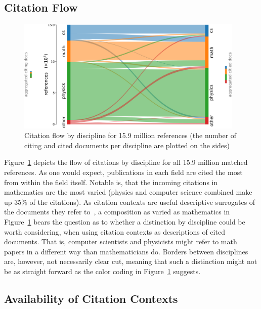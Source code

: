 \subsection{Citation Flow}

\begin{figure}
  \centering
    \includegraphics[width=0.97\textwidth]{figures/corpus/Fig7.pdf}
  \caption[Citation flow by discipline for 15.9 million references]{Citation flow by discipline for 15.9 million references (the number of citing and cited documents per discipline are plotted on the sides)}
  \label{fig:sankey}
\end{figure}

Figure~\ref{fig:sankey} depicts the flow of citations by discipline for all 15.9 million matched references. As one would expect, publications in each field are cited the most from within the field itself. Notable is, that the incoming citations in mathematics are the most varied (physics and computer science combined make up 35\% of the citations). As citation contexts are useful descriptive surrogates of the documents they refer to~\cite{Elkiss2008}, a composition as varied as mathematics in Figure~\ref{fig:sankey} bears the question as to whether a distinction by discipline could be worth considering, when using citation contexts as descriptions of cited documents. That is, computer scientists and physicists might refer to math papers in a different way than mathematicians do. Borders between disciplines are, however, not necessarily clear cut, meaning that such a distinction might not be as straight forward as the color coding in Figure~\ref{fig:sankey} suggests.

\subsection{Availability of Citation Contexts}

